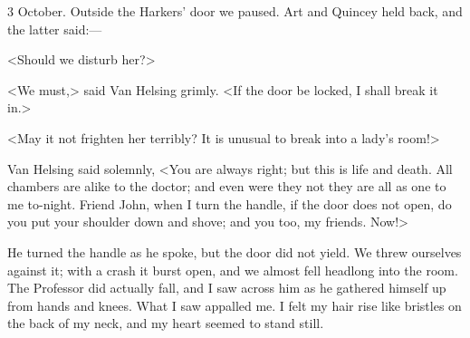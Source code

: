 \begin{diary}{3 October.}
Outside the Harkers' door we paused. Art and Quincey held back, and the latter said:—

<Should we disturb her?>

<We must,> said Van Helsing grimly. <If the door be locked, I shall break it in.>

<May it not frighten her terribly? It is unusual to break into a lady's room!>

Van Helsing said solemnly, <You are always right; but this is life and death. All chambers are alike to the doctor; and even were they not they are all as one to me to-night. Friend John, when I turn the handle, if the door does not open, do you put your shoulder down and shove; and you too, my friends. Now!>

He turned the handle as he spoke, but the door did not yield. We threw ourselves against it; with a crash it burst open, and we almost fell headlong into the room. The Professor did actually fall, and I saw across him as he gathered himself up from hands and knees. What I saw appalled me. I felt my hair rise like bristles on the back of my neck, and my heart seemed to stand still.


\end{diary}
